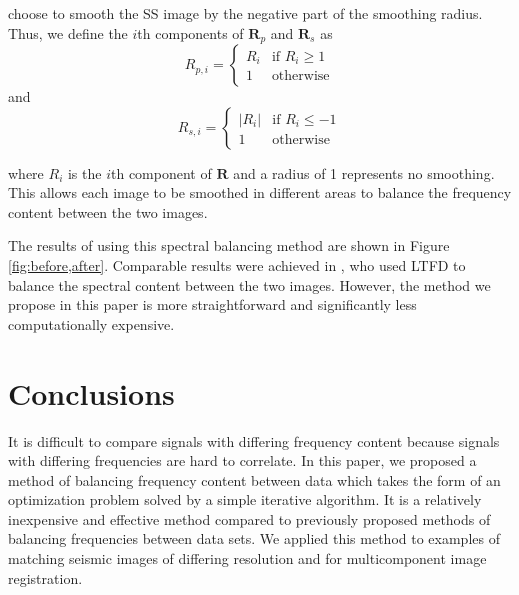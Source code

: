         choose to smooth the SS image by the negative part of the smoothing radius. 
        Thus, we define the $i$th components of $\mathbf{R}_p$ and $\mathbf{R}_s$ as
        \begin{equation}
                R_{p,i} = \begin{cases} R_{i} &\mbox{if } R_{i} \ge 1 \\
        1 & \mbox{otherwise} \end{cases} 
        \end{equation}
        and
        \begin{equation}
                R_{s,i} = \begin{cases} |R_{i}| &\mbox{if } R_{i} \le -1 \\
        1 & \mbox{otherwise} \end{cases} 
        \end{equation}

        where $R_i$ is the $i$th component of $\mathbf{R}$ and a radius of 1 represents no
        smoothing. This allows each image to be smoothed in different areas to balance the frequency
        content between the two images.


        The results of using this spectral balancing method are shown in Figure
        \ref{fig:before,after}. Comparable results were achieved in \cite{ltft}, who used LTFD to
        balance the spectral content between the two images. However, the method we propose in this
        paper is more straightforward and significantly less computationally expensive.

\section{Conclusions}
        It is difficult to compare signals with differing frequency content because signals with
        differing frequencies are hard to correlate. In this paper, we proposed a method of
        balancing frequency content between data which takes the form of an optimization problem
        solved by a simple iterative algorithm. It is a relatively inexpensive and effective method
        compared to previously proposed methods of balancing frequencies between data sets. We
        applied this method to examples of matching seismic images of differing resolution and for
        multicomponent image registration.

